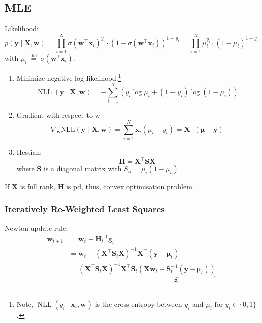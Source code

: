 \documentclass[11pt, %
	oneside, %
	english, %
	onehalfspacing, %
	parskip, %
	]{article} %
\theoremstyle{definition}
\begin{document}
\subsection*{MLE}

Likelihood:
\begin{equation*}
	p(\mathbf{y} \mid \mathbf{X}, \mathbf{w})=\prod_{i=1}^N \sigma\left(\mathbf{w}^{\top} \mathbf{x}_i\right)^{y_i} \cdot\left(1-\sigma\left(\mathbf{w}^{\top} \mathbf{x}_i\right)\right)^{1-y_i}=\prod_{i=1}^N \mu_i^{y_i} \cdot\left(1-\mu_i\right)^{1-y_i}
\end{equation*}
with $\mu_i \stackrel{\text { def }}{=} \sigma\left(\mathbf{w}^{\top} \mathbf{x}_i\right)$.

\begin{enumerate}
	\item Minimize negative log-likelihood.\footnote{Note, $\operatorname{NLL}\left(y_i \mid \mathbf{x}_i, \mathbf{w}\right)$  is the cross-entropy between  $y_i$ and $\mu_i \text { for } y_i \in\{0,1\}$.}
	$$
	\operatorname{NLL}(\mathbf{y} \mid \mathbf{X}, \mathbf{w})=-\sum_{i=1}^N\left(y_i \log \mu_i+\left(1-y_i\right) \log \left(1-\mu_i\right)\right)
	$$
	\item Gradient with respect to w
	$$
	\nabla_{\mathbf{w}} \mathrm{NLL}(\mathbf{y} \mid \mathbf{X}, \mathbf{w})=\sum_{i=1}^N \mathbf{x}_i\left(\mu_i-y_i\right)=\mathbf{X}^{\top}(\boldsymbol{\mu}-\mathbf{y})
	$$
	\item Hessian:
	$$
	\mathbf{H}=\mathbf{X}^{\top} \mathbf{S X}
	$$
	where $\mathbf{S}$ is a diagonal matrix with $S_{i i}=\mu_i\left(1-\mu_i\right)$
\end{enumerate}
If $\mathbf{X}$ is full rank, $\mathbf{H}$ is pd, thus, convex optimisation problem.


\subsubsection*{Iteratively Re-Weighted Least Squares}

Newton update rule:
\begin{equation*}
	\begin{aligned}
		\mathbf{w}_{t+1} & =\mathbf{w}_t-\mathbf{H}_t^{-1} \mathbf{g}_t \\
		& =\mathbf{w}_t+\left(\mathbf{X}^{\top} \mathbf{S}_t \mathbf{X}\right)^{-1} \mathbf{X}^{\top}\left(\mathbf{y}-\boldsymbol{\mu}_t\right) \\
		& =\left(\mathbf{X}^{\top} \mathbf{S}_t \mathbf{X}\right)^{-1} \mathbf{X}^{\top} \mathbf{S}_t \underbrace{\left(\mathbf{X w}_t+\mathbf{S}_t^{-1}\left(\mathbf{y}-\boldsymbol{\mu}_t\right)\right)}_{\mathbf{z}_t}
	\end{aligned}
\end{equation*}
\end{document}
